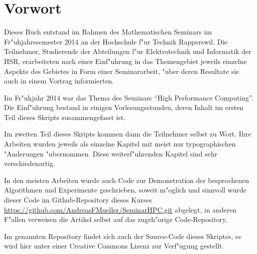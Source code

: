 \chapter*{Vorwort}
\rhead{}
Dieses Buch entstand im Rahmen des Mathematischen Seminars
im Fr"uhjahrssemester 2014 an der Hochschule f"ur Technik Rapperswil.
Die Teilnehmer, Studierende der Abteilungen f"ur Elektrotechnik und
Informatik der
HSR, erarbeiteten nach einer Einf"uhrung in das Themengebiet jeweils
einzelne Aspekte des Gebietes in Form einer Seminararbeit, "uber
deren Resultate sie auch in einem Vortrag informierten. 

Im Fr"uhjahr 2014 war das Thema des Seminars ``High Performance Computing''.
Die Einf"uhrung bestand in einigen Vorlesungsstunden, deren
Inhalt im ersten Teil dieses Skripts zusammengefasst ist.

Im zweiten Teil dieses Skripts kommen dann die Teilnehmer
selbst zu Wort. Ihre Arbeiten wurden jeweils als einzelne
Kapitel mit meist nur typographischen "Anderungen "ubernommen.
Diese weiterf"uhrenden Kapitel sind sehr verschiedenartig.

In den meisten Arbeiten wurde auch Code zur Demonstration der 
besprochenen Algorithmen und Experimente geschrieben, soweit
m"oglich und sinnvoll wurde dieser Code im Github-Repository
dieses Kurses \url{https://github.com/AndreasFMueller/SeminarHPC.git}
abgelegt, in anderen F"allen verweisen die Artikel selbst auf
das zugeh"orige Code-Repository.

Im genannten Repository findet sich auch der Source-Code dieses
Skriptes, es wird hier unter einer Creative Commons Lizenz
zur Verf"ugung gestellt.

